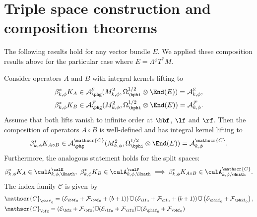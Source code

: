 \section{Triple space construction and composition theorems} \label{section 6}
The following results hold for any vector bundle $E$.
We applied these composition results above for the particular case
where $E= \Lambda {}^\phi T^*M$.

\begin{Th} \label{compositionth-smooth}
Consider operators $A$ and $B$ with integral kernels lifting to
\begin{equation}
\begin{split}
&\beta_{k,\phi}^*K_{A} \in \mathcal{A}_{\phg}^{\mathcal{E}}(M^2_{k,\phi}, \Omega_{\bphi}^{1/2}
\otimes \End(E)) = \mathcal{A}^{\mathcal{E}}_{k,\phi}, \\
&\beta_{k,\phi}^*K_{B} \in \mathcal{A}_{\phg}^{\mathcal{F}}(M^2_{k,\phi}, \Omega_{\bphi}^{1/2}
\otimes \End(E)) = \mathcal{A}^{\mathcal{F}}_{k,\phi}.
\end{split}
\end{equation}
Assume that both lifts vanish to infinite order at $\bbf$, $\lf$ and $\rf$. Then the composition of operators $A \circ B$
is well-defined and has integral kernel lifting to
\begin{equation}
\label{eqn:AB}
\beta_{k,\phi}^*K_{A \circ B} \in \mathcal{A}_{\phg}^{\mathscr{C}}(M^2_{k,\phi}, \Omega_{\bphi}^{1/2}
\otimes \End(E)) = \mathcal{A}^{\mathscr{C}}_{k,\phi}.
\end{equation}
Furthermore, the analogous statement holds for the split spaces:
\begin{equation}
\label{eqn:AB split}
\beta_{k,\phi}^*K_{A}\in \calA^\calE_{k,\phi,\Hmath},\ \beta_{k,\phi}^* K_{B} \in\calA^\calF_{k,\phi,\Hmath}\implies
\beta_{k,\phi}^*K_{A\circ B} \in \calA^{\mathscr{C}}_{k,\phi,\Hmath}.
\end{equation}
The index family $\mathscr{C}$ is given by
\begin{equation}\label{composition-index-family}
\begin{split}
&\mathscr{C}_{\phif_0} = \left(\mathcal{E}_{\bbf_0} + \mathcal{F}_{\bbf_0} + (b+1)\right)
\overline{\cup} \left(\mathcal{E}_{\lf_0} + \mathcal{F}_{\rf_0} + (b+1)\right)
\overline{\cup} \left(\mathcal{E}_{\phif_0} + \mathcal{F}_{\phif_0} \right), \\
&\mathscr{C}_{\bfz} = (\mathcal{E}_{\bfz} + \mathcal{F}_{\bfz})
\overline{\cup} (\mathcal{E}_{\lf_{0}} + \mathcal{F}_{\rfz}) \overline{\cup} (\mathcal{E}_{\phif_0} + \mathcal{F}_{\bbf_0})

\end{split}
\end{equation}
\end{Th}
